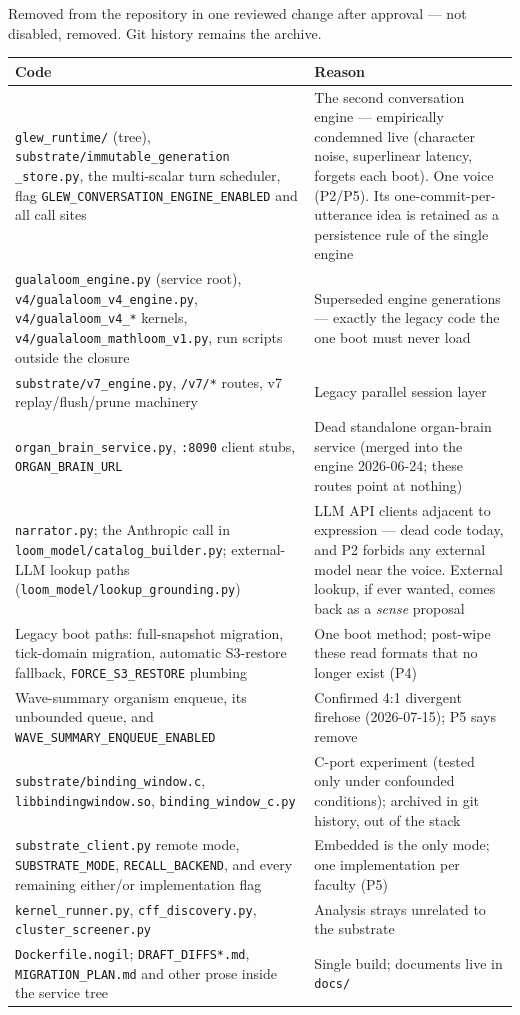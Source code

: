 \documentclass[11pt]{article}
\begin{document}
Removed from the repository in one reviewed change after approval — not
disabled, removed. Git history remains the archive.

\begin{longtable}{p{} p{}}
\toprule
\textbf{Code} & \textbf{Reason} \\
\midrule
\texttt{glew\_runtime/} (tree), \texttt{substrate/immutable\_generation%
\_store.py}, the multi-scalar turn scheduler, flag
\texttt{GLEW\_CONVERSATION\_ENGINE\_ENABLED} and all call sites &
The second conversation engine — empirically condemned live (character
noise, superlinear latency, forgets each boot). One voice (P2/P5). Its
one-commit-per-utterance idea is retained as a persistence rule of the
single engine \\
\texttt{gualaloom\_engine.py} (service root),
\texttt{v4/gualaloom\_v4\_engine.py}, \texttt{v4/gualaloom\_v4\_*} kernels,
\texttt{v4/gualaloom\_mathloom\_v1.py}, run scripts outside the closure &
Superseded engine generations — exactly the legacy code the one boot must
never load \\
\texttt{substrate/v7\_engine.py}, \texttt{/v7/*} routes, v7
replay/flush/prune machinery &
Legacy parallel session layer \\
\texttt{organ\_brain\_service.py}, \texttt{:8090} client stubs,
\texttt{ORGAN\_BRAIN\_URL} &
Dead standalone organ-brain service (merged into the engine 2026-06-24;
these routes point at nothing) \\
\texttt{narrator.py}; the Anthropic call in
\texttt{loom\_model/catalog\_builder.py}; external-LLM lookup paths
(\texttt{loom\_model/lookup\_grounding.py}) &
LLM API clients adjacent to expression — dead code today, and P2 forbids
any external model near the voice. External lookup, if ever wanted, comes
back as a \emph{sense} proposal \\
Legacy boot paths: full-snapshot migration, tick-domain migration,
automatic S3-restore fallback, \texttt{FORCE\_S3\_RESTORE} plumbing &
One boot method; post-wipe these read formats that no longer exist (P4) \\
Wave-summary organism enqueue, its unbounded queue, and
\texttt{WAVE\_SUMMARY\_ENQUEUE\_ENABLED} &
Confirmed 4:1 divergent firehose (2026-07-15); P5 says remove \\
\texttt{substrate/binding\_window.c}, \texttt{libbindingwindow.so},
\texttt{binding\_window\_c.py} &
C-port experiment (tested only under confounded conditions); archived in
git history, out of the stack \\
\texttt{substrate\_client.py} remote mode, \texttt{SUBSTRATE\_MODE},
\texttt{RECALL\_BACKEND}, and every remaining either/or implementation
flag &
Embedded is the only mode; one implementation per faculty (P5) \\
\texttt{kernel\_runner.py}, \texttt{cff\_discovery.py},
\texttt{cluster\_screener.py} &
Analysis strays unrelated to the substrate \\
\texttt{Dockerfile.nogil}; \texttt{DRAFT\_DIFFS*.md},
\texttt{MIGRATION\_PLAN.md} and other prose inside the service tree &
Single build; documents live in \texttt{docs/} \\
\bottomrule
\end{longtable}
\end{document}
